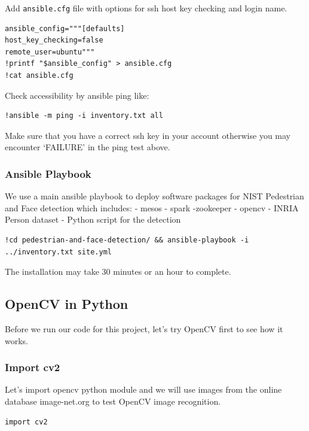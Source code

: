 Add \texttt{ansible.cfg} file with options for ssh host key checking and
login name.

\begin{verbatim}
ansible_config="""[defaults]
host_key_checking=false
remote_user=ubuntu"""
!printf "$ansible_config" > ansible.cfg
!cat ansible.cfg
\end{verbatim}

Check accessibility by ansible ping like:

\begin{verbatim}
!ansible -m ping -i inventory.txt all
\end{verbatim}

Make sure that you have a correct ssh key in your account otherwise you
may encounter `FAILURE' in the ping test above.

\subsubsection{Ansible Playbook}\label{ansible-playbook}

We use a main ansible playbook to deploy software packages for NIST
Pedestrian and Face detection which includes: - mesos - spark -zookeeper
- opencv - INRIA Person dataset - Python script for the detection

\begin{verbatim}
!cd pedestrian-and-face-detection/ && ansible-playbook -i ../inventory.txt site.yml
\end{verbatim}

The installation may take 30 minutes or an hour to complete.

\subsection{OpenCV in Python}\label{opencv-in-python}

Before we run our code for this project, let's try OpenCV first to see
how it works.

\subsubsection{Import cv2}\label{import-cv2}

Let's import opencv python module and we will use images from the online
database image-net.org to test OpenCV image recognition.

\begin{verbatim}
import cv2
\end{verbatim}

